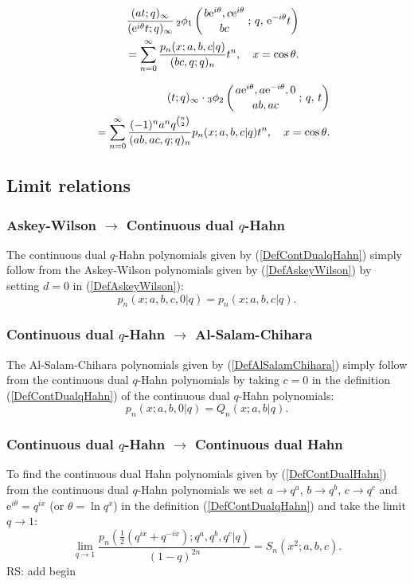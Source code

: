 \documentclass[envcountchap,graybox]{svmono}
\newcounter{rom}
\newcommand{\qhyp}[5]{\mbox{}_{#1}{\phi}_{#2}
\left(\genfrac{}{}{0pt}{}{#3}{#4}\,;\,q,\,#5\right)}
\newcommand{\e}{\textrm{e}}
\newcommand{\qhyp}[5]{\,\mbox{}_{#1}\phi_{#2}\!\left(
  \genfrac{}{}{0pt}{}{#3}{#4};#5\right)}
\begin{document}
\begin{eqnarray}
\label{GenContDualqHahn3}
& &\frac{(at;q)_{\infty}}{(\e^{i\theta}t;q)_{\infty}}\,
\qhyp{2}{1}{b\e^{i\theta},c\e^{i\theta}}{bc}{\e^{-i\theta}t}\nonumber\\
& &{}=\sum_{n=0}^{\infty}\frac{p_n(x;a,b,c|q)}{(bc,q;q)_n}t^n,
\quad x=\cos\theta.
\end{eqnarray}

\begin{eqnarray}
& &\label{GenContDualqHahn4}
(t;q)_{\infty}\cdot\qhyp{3}{2}{a\e^{i\theta},a\e^{-i\theta},0}{ab,ac}{t}\nonumber\\
& &{}=\sum_{n=0}^{\infty}\frac{(-1)^na^nq^{\binom{n}{2}}}{(ab,ac,q;q)_n}
p_n(x;a,b,c|q)t^n,\quad x=\cos\theta.
\end{eqnarray}

\subsection*{Limit relations}

\subsubsection*{Askey-Wilson $\rightarrow$ Continuous dual $q$-Hahn}
The continuous dual $q$-Hahn polynomials given by (\ref{DefContDualqHahn}) simply follow
from the Askey-Wilson polynomials given by (\ref{DefAskeyWilson}) by setting
$d=0$ in (\ref{DefAskeyWilson}):
$$p_n(x;a,b,c,0|q)=p_n(x;a,b,c|q).$$

\subsubsection*{Continuous dual $q$-Hahn $\rightarrow$ Al-Salam-Chihara}
The Al-Salam-Chihara polynomials given by (\ref{DefAlSalamChihara}) simply follow
from the continuous dual $q$-Hahn polynomials by taking $c=0$ in the
definition (\ref{DefContDualqHahn}) of the continuous dual $q$-Hahn polynomials:
\begin{equation}
p_n(x;a,b,0|q)=Q_n(x;a,b|q).
\end{equation}

\subsubsection*{Continuous dual $q$-Hahn $\rightarrow$ Continuous dual Hahn}
To find the continuous dual Hahn polynomials given by (\ref{DefContDualHahn})
from the continuous dual $q$-Hahn polynomials we set $a\rightarrow q^a$,
$b\rightarrow q^b$, $c\rightarrow q^c$ and $\e^{i\theta}=q^{ix}$
(or $\theta=\ln q^x$) in the definition (\ref{DefContDualqHahn}) and take the
limit $q\rightarrow 1$:
\begin{equation}
\lim_{q\rightarrow 1}\frac{p_n(\frac{1}{2}\left(q^{ix}+q^{-ix}\right);q^a,q^b,q^c|q)}{(1-q)^{2n}}=S_n(x^2;a,b,c).
\end{equation}
 RS: add begin\label{sec14.2}
\end{document}
